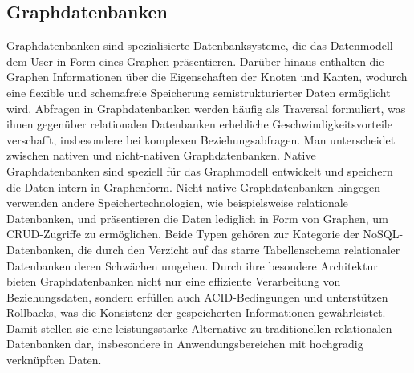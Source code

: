 \subsection{Graphdatenbanken} %
\label{sec:graphDatenbanken}
Graphdatenbanken sind spezialisierte Datenbanksysteme, die das Datenmodell dem User in Form eines Graphen präsentieren. Darüber hinaus enthalten die Graphen Informationen über die Eigenschaften der Knoten und Kanten, wodurch eine flexible und schemafreie Speicherung semistrukturierter Daten ermöglicht wird. Abfragen in Graphdatenbanken werden häufig als Traversal formuliert, was ihnen gegenüber relationalen Datenbanken erhebliche Geschwindigkeitsvorteile verschafft, insbesondere bei komplexen Beziehungsabfragen.
Man unterscheidet zwischen nativen und nicht-nativen Graphdatenbanken. Native Graphdatenbanken sind speziell für das Graphmodell entwickelt und speichern die Daten intern in Graphenform. Nicht-native Graphdatenbanken hingegen verwenden andere Speichertechnologien, wie beispielsweise relationale Datenbanken, und präsentieren die Daten lediglich in Form von Graphen, um CRUD-Zugriffe zu ermöglichen. Beide Typen gehören zur Kategorie der NoSQL-Datenbanken, die durch den Verzicht auf das starre Tabellenschema relationaler Datenbanken deren Schwächen umgehen.
Durch ihre besondere Architektur bieten Graphdatenbanken nicht nur eine effiziente Verarbeitung von Beziehungsdaten, sondern erfüllen auch ACID-Bedingungen und unterstützen Rollbacks, was die Konsistenz der gespeicherten Informationen gewährleistet. Damit stellen sie eine leistungsstarke Alternative zu traditionellen relationalen Datenbanken dar, insbesondere in Anwendungsbereichen mit hochgradig verknüpften Daten.
\citep{9677042} \citep{graphdb} 

